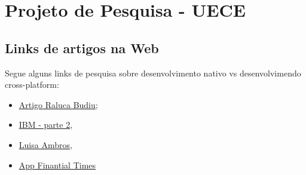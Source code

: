 \documentclass[a4paper,12pt]{article}
\begin{document}
	\section{Projeto de Pesquisa - UECE} %
	\label{sec:projeto_de_pesquisa_uece}
		\subsection{Links de artigos na Web} %
		\label{sub:links_de_artigos_na_web}
		Segue alguns links de pesquisa sobre desenvolvimento nativo vs desenvolvimendo cross-platform:
		\begin{itemize}
			\item \href{http://www.nngroup.com/articles/mobile-native-apps/}{Artigo Raluca Budiu};
			\item \href{https://www.ibm.com/developerworks/community/blogs/ctaurion/entry/desenvolvimento_de_apps-parte_2_hibrido_nativo_ou_web?lang=en}{IBM - parte 2},
			\item \href{http://luisaambros.com/blog/diferenca-entre-aplicativos-nativos-hibridos-e-mobile-web-apps/}{Luisa Ambros},
			\item \href{http://techcrunch.com/2011/06/07/ft-bypasses-apples-itunes-launches-html5-web-app-free-access-first-week/}{App Finantial Times} 
		\end{itemize}	
\end{document}
